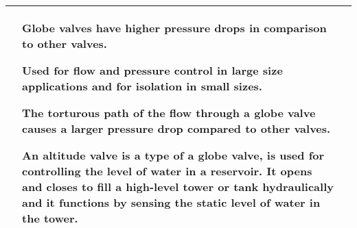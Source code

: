 \begin{landscape}
\begin{table}
\begin{tabular}{| m{7cm} m{10cm} | m{7cm} | }
{\begin{itemize}[topsep=5pt, partopsep=0pt]
  \end{itemize}}  
    &
        \vspace{0.4cm}
      \begin{itemize}[leftmargin=*]
      \scriptsize{
       \item Globe valves have higher pressure drops in comparison to other valves.
        \item \textbf{Used for flow and pressure control in large size applications and for isolation in small sizes.  }
        \item The torturous path of the flow through a globe valve causes a larger pressure drop compared to other valves. 
        \item An \textbf{altitude valve} is a type of a globe valve, is used for controlling the level of water in a reservoir.  It opens and closes to fill a high-level tower or tank hydraulically and it functions by sensing the static level of water in the tower.}
      \end{itemize}
  
    \\ \hline


\end{tabular}
\end{table}
\end{landscape}
